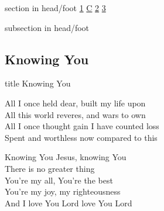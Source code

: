 \documentclass{beamer}
\begin{document}
{
{ 
 {
 \begin{beamercolorbox}[ht=4.5ex,dp=1.5ex,%
      leftskip=.3cm,rightskip=.3cm plus1fil]{section in head/foot}
 \fontsize{12}{25}\selectfont 
\hyperlink{Knowing You['All I once held dear']1}{1}
\hyperlink{Knowing You['All I once held dear']C}{C}
\hyperlink{Knowing You['All I once held dear']2}{2}
\hyperlink{Knowing You['All I once held dear']3}{3}
 
 \end{beamercolorbox}%
  \begin{beamercolorbox}[ht=2.5ex,dp=1.125ex,%
   leftskip=.3cm,rightskip=.3cm plus1fil]{subsection in head/foot}
   \insertauthor
 \end{beamercolorbox}%
 }
}
\subsection{ Knowing You }

\hypertarget{Knowing You['All I once held dear']}{}
\begin{frame}{}
 \vfill
  \centering
  \begin{beamercolorbox}[sep=8pt,center,shadow=true,rounded=true]{title}
    Knowing You     
  \end{beamercolorbox}
  \vfill
\end{frame}

\hypertarget{Knowing You['All I once held dear']1}{}
\begin{frame}{}
\fontsize{ 18 }{ 23 }\selectfont

All I once held dear, built my life upon\\ 
All this world reveres, and wars to own\\ 
All I once thought gain I have counted loss\\ 
Spent and worthless now compared to this 

\end{frame}

\hypertarget{Knowing You['All I once held dear']C}{}
\begin{frame}{}
\fontsize{ 18 }{ 23 }\selectfont

Knowing You Jesus, knowing You\\ 
There is no greater thing\\ 
You're my all, You're the best\\ 
You're my joy, my righteousness\\ 
And I love You Lord love You Lord 


\end{frame}}
\end{document}
